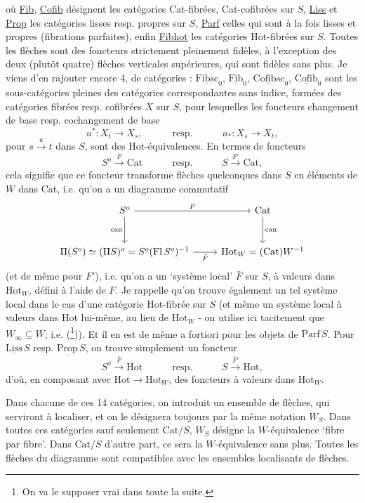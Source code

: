 \documentclass[11pt]{article}
\newcommand{\printedpage}[1]{\marginpar{\footnotesize p.~#1}}
\newcommand{\msp}[1]{\marginpar{\footnotesize [#1]}}
\newcommand{\ul}[1]{\underline{\mathrm{#1}}}
\begin{document}
\printedpage{5}
où \underline{Fib}, \underline{Cofib} désignent les catégories Cat-fibrées, Cat-cofibrées sur $S$, \underline{Liss} et \underline{Prop} les catégories
\msp{page 6}
lisses resp. propres sur $S$, \underline{Parf} celles qui sont à la fois lisses et propres (fibrations parfaites), enfin \underline{Fibhot} les catégories Hot-fibrées sur $S$. Toutes les flèches sont des foncteurs strictement pleinement fidèles, à l'exception des deux (plutôt quatre) flèches verticales supérieures, qui sont fidèles sans plus. Je viens d'en rajouter encore 4, de catégories : $\ul{Fibsc}_0$, $\ul{Fib}_0$, $\ul{Cofibsc}_0$, $\ul{Cofib}_0$ sont les sous-catégories pleines des catégories correspondantes sans indice, formées des catégories fibrées resp. cofibrées $X$ sur $S$, pour lesquelles les foncteurs changement de base resp. cochangement de base
\[
u^* : X_t \longrightarrow X_s, \qquad\quad \text{resp.} \qquad\quad u_* : X_s \longrightarrow X_t,
\]
pour $s \xrightarrow{u} t$ dans $S$, sont des Hot-équivalences. En termes de foncteurs
\[
S^o \xrightarrow{F} \mathrm{Cat} \qquad\quad \text{resp.} \qquad\quad S \xrightarrow{F'} \mathrm{Cat},
\]
cela signifie que ce foncteur transforme flèches quelconques dans $S$ en éléments de $W$ dans Cat, i.e. qu'on a un diagramme commutatif
\[
\begin{tikzcd}[row sep=large]
S^o \arrow[r, "F"] \arrow[d, "\mathrm{can}"'] & \mathrm{Cat} \arrow[d, "\mathrm{can}"] \\
\Pi(S^o) \simeq (\Pi S)^o = S^o(\mathrm{Fl}\,S^o)^{-1} \arrow[r, "\bar F"'] & \mathrm{Hot}_W = (\mathrm{Cat})W^{-1}
\end{tikzcd}
\]
(et de même pour $F'$), i.e. qu'on a un `système
\msp{page 7}
local' $\bar F$ sur $S$, à valeurs dans $\mathrm{Hot}_W$, défini à l'aide de $F$. Je rappelle qu'on trouve également un tel système local dans le cas d'une catégorie Hot-fibrée sur $S$ (et même un système local à valeurs dans Hot lui-même, au lieu de $\mathrm{Hot}_W$ - on utilise ici tacitement que $W_\infty \subseteq W$, i.e.  (\footnote[5]{On va le supposer vrai dans toute la suite.})). Et il en est de même a fortiori pour les objets de $\ul{Parf}\,S$. Pour $\ul{Liss}\,S$ resp. $\ul{Prop}\,S$, on trouve simplement un foncteur
\[
S^o \xrightarrow{\bar F} \mathrm{Hot} \qquad\quad \text{resp.} \qquad\quad S \xrightarrow{\bar F'} \mathrm{Hot},
\]
d'où, en composant avec $\mathrm{Hot} \longrightarrow \mathrm{Hot}_W$, des foncteurs à valeurs dans $\mathrm{Hot}_W$.

Dans chacune de ces 14 catégories, on introduit un ensemble de flèches, qui serviront à localiser, et on le désignera toujours par la même notation $W_S$. Dans toutes ces catégories sauf seulement $\mathrm{Cat}/S$, $W_S$ désigne la $W$-équivalence `fibre par fibre'. Dans $\mathrm{Cat}/S$ d'autre part, ce sera la $W$-équivalence sans plus. Toutes les flèches du diagramme sont compatibles avec les ensembles localisants de flèches.
\end{document}
